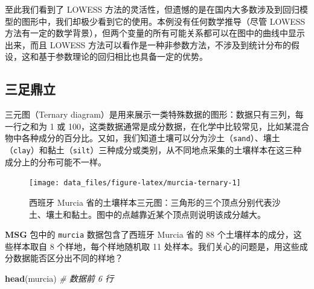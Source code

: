 \documentclass[
  b5paper,
  UTF8,twoside]{book}
\newenvironment{Shaded}{\begin{snugshade}}{\end{snugshade}}
\newcommand{\AttributeTok}[1]{\textcolor[rgb]{0.13,0.29,0.53}{#1}}
\newcommand{\CommentTok}[1]{\textcolor[rgb]{0.56,0.35,0.01}{\textit{#1}}}
\newcommand{\DecValTok}[1]{\textcolor[rgb]{0.00,0.00,0.81}{#1}}
\newcommand{\FunctionTok}[1]{\textcolor[rgb]{0.13,0.29,0.53}{\textbf{#1}}}
\newcommand{\NormalTok}[1]{#1}
\newcommand{\SpecialCharTok}[1]{\textcolor[rgb]{0.81,0.36,0.00}{\textbf{#1}}}
\newcommand{\StringTok}[1]{\textcolor[rgb]{0.31,0.60,0.02}{#1}}
\begin{document}
至此我们看到了 LOWESS 方法的灵活性，但遗憾的是在国内大多数涉及到回归模型的图形中，我们却极少看到它的使用。本例没有任何数学推导（尽管 LOWESS 方法有一定的数学背景），但两个变量的所有可能关系都可以在图中的曲线中显示出来，而且 LOWESS 方法可以看作是一种非参数方法，不涉及到统计分布的假设，这和基于参数理论的回归相比也具备一定的优势。

\subsection{三足鼎立}\label{subsec:ternary}

三元图（Ternary diagram）是用来展示一类特殊数据的图形：数据只有三列，每一行之和为 1 或 100，这类数据通常是成分数据，在化学中比较常见，比如某混合物中各种成分的百分比。又如，我们知道土壤可以分为沙土（\texttt{sand}）、壤土（\texttt{clay}）和黏土（\texttt{silt}）三种成分或类别，从不同地点采集的土壤样本在这三种成分上的分布可能不一样。

\begin{Shaded}
\end{Shaded}

\begin{figure}

{\centering \texttt{[image: data\_files/figure-latex/murcia-ternary-1]} 

}

\caption[西班牙 Murcia 省的土壤样本三元图]{西班牙 Murcia 省的土壤样本三元图：三角形的三个顶点分别代表沙土、壤土和黏土。图中的点越靠近某个顶点则说明该成分越大。}\label{fig:murcia-ternary}
\end{figure}



\textbf{MSG} 包中的 \texttt{murcia} 数据包含了西班牙 Murcia 省的 88 个土壤样本的成分，这些样本取自 8 个样地，每个样地随机取 11 处样本。我们关心的问题是，用这些成分数据能否区分出不同的样地？

\begin{Shaded}
\begin{Highlighting}[]
\FunctionTok{head}\NormalTok{(murcia) }\CommentTok{\# 数据前 6 行}
\end{Highlighting}
\end{Shaded}
\end{document}
